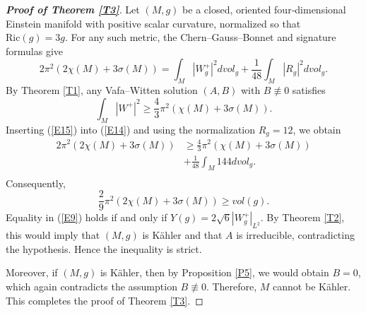 \documentclass[10pt,a4paper]{amsart}
\begin{document}
\begin{proof}[\textbf{Proof of Theorem \ref{T3}}]
Let $(M,g)$ be a closed, oriented four‑dimensional Einstein manifold with positive scalar curvature, normalized so that $\mathrm{Ric}(g)=3g$. For any such metric, the Chern–Gauss–Bonnet and signature formulas give
\begin{equation}\label{E14}
2\pi^{2}(2\chi(M)+3\sigma(M))=\int_{M}|W^{+}_{g}|^{2}dvol_{g}+\frac{1}{48}\int_{M}|R_{g}|^{2}dvol_{g}.
\end{equation}
By Theorem \ref{T1}, any Vafa–Witten solution $(A,B)$ with $B\not\equiv0$ satisfies
\begin{equation}\label{E15}
\int_{M}|W^{+}|^{2}\geq\frac{4}{3}\pi^{2}(\chi(M)+3\sigma(M)).
\end{equation}
Inserting (\ref{E15}) into (\ref{E14}) and using the normalization $R_{g}=12$, we obtain
\begin{equation*}
\begin{split}
2\pi^{2}(2\chi(M)+3\sigma(M))&\geq\frac{4}{3}\pi^{2}(\chi(M)+3\sigma(M))\\
&+\frac{1}{48}\int_{M}144dvol_{g}.\\
\end{split}
\end{equation*}
Consequently,
\begin{equation}\label{E9}
\frac{2}{9}\pi^{2}(2\chi(M)+3\sigma(M))\geq vol(g).
\end{equation}
Equality in (\ref{E9}) holds if and only if $Y(g)=2\sqrt{6}|W^{+}_{g}|_{L^{2}}$. By Theorem \ref{T2}, this would imply that $(M,g)$ is Kähler and that $A$ is irreducible, contradicting the hypothesis. Hence the inequality is strict. 

Moreover, if $(M,g)$ is K\"{a}hler, then by Proposition \ref{P5}, we would obtain  $B=0$, which again contradicts the assumption $B\not\equiv0$. Therefore, $M$ cannot be K\"{a}hler. This completes the proof of Theorem \ref{T3}.
\end{proof}
\end{document}
